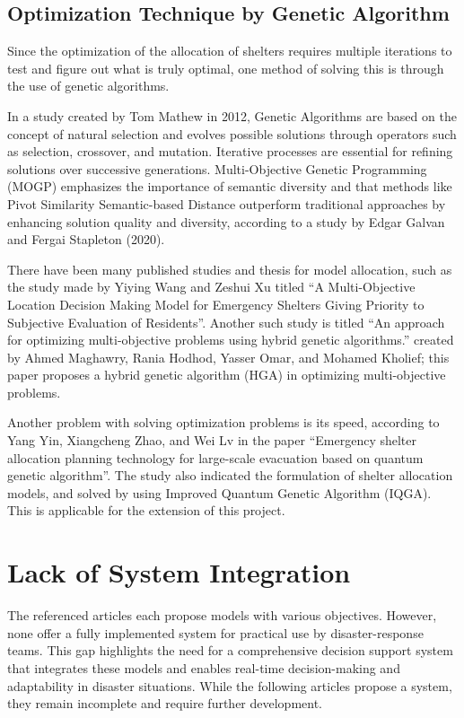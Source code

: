 \subsection{Optimization Technique by Genetic Algorithm}

	Since the optimization of the allocation of shelters requires multiple iterations to test and figure out what is truly optimal, one method of solving this is through the use of genetic algorithms.
	
	In a study created by Tom Mathew in 2012, Genetic Algorithms are based on the concept of natural selection and evolves possible solutions through operators such as selection, crossover, and mutation. Iterative processes are essential for refining solutions over successive generations. Multi-Objective Genetic Programming (MOGP) emphasizes the importance of semantic diversity and that methods like Pivot Similarity Semantic-based Distance outperform traditional approaches by enhancing solution quality and diversity, according to a study by Edgar Galvan and Fergai Stapleton (2020). \parencite{Mathew2012}
	
	There have been many published studies and thesis for model allocation, such as the study made by Yiying Wang and Zeshui Xu titled “A Multi-Objective Location Decision Making Model for Emergency Shelters Giving Priority to Subjective Evaluation of Residents”. Another such study is titled “An approach for optimizing multi-objective problems using hybrid genetic algorithms.” created by Ahmed Maghawry, Rania Hodhod, Yasser Omar, and Mohamed Kholief; this paper proposes a hybrid genetic algorithm (HGA) in optimizing multi-objective problems. \parencite{Yiying2022}
	
	Another problem with solving optimization problems is its speed, according to Yang Yin, Xiangcheng Zhao, and Wei Lv in the paper “Emergency shelter allocation planning technology for large-scale evacuation based on quantum genetic algorithm”. The study also indicated the formulation of shelter allocation models, and solved by using Improved Quantum Genetic Algorithm (IQGA). This is applicable for the extension of this project. \parencite{Yin2023}

\section{Lack of System Integration}
	The referenced articles each propose models with various objectives. However, none offer a fully implemented system for practical use by disaster-response teams. This gap highlights the need for a comprehensive decision support system that integrates these models and enables real-time decision-making and adaptability in disaster situations. While the following articles propose a system, they remain incomplete and require further development.
	
